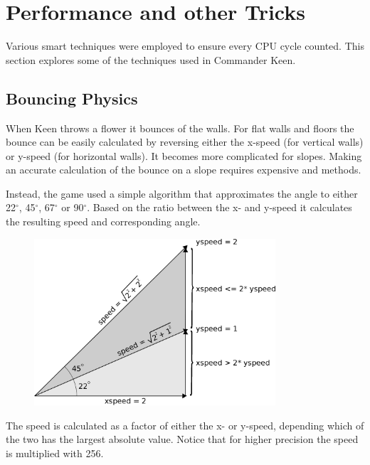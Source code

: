 \documentclass[book.tex]{subfiles}
\begin{document}
\section{Performance and other Tricks}
Various smart techniques were employed to ensure every CPU cycle counted. This section explores some of the techniques used in Commander Keen.


\subsection{Bouncing Physics}
When Keen throws a flower it bounces of the walls. For flat walls and floors the bounce can be easily calculated by reversing either the x-speed (for vertical walls) or y-speed (for horizontal walls). It becomes more complicated for slopes. Making an accurate calculation of the bounce on a slope requires expensive  and  methods. \\
\par
Instead, the game used a simple algorithm that approximates the angle to either 22$^{\circ}$, 45$^{\circ}$, 67$^{\circ}$ or 90$^{\circ}$. Based on the ratio between the x- and y-speed it calculates the resulting speed and corresponding angle. \\
\par
\begin{figure}[H]
\centering
\includegraphics[width=0.8\textwidth]{imgs/drawings/angle_0.eps}
\label{fig:angles}
\end{figure}
\par

The speed is calculated as a factor of either the x- or y-speed, depending which of the two has the largest absolute value. Notice that for higher precision the speed is multiplied with 256.\\
\par
\begin{minipage}{\textwidth}
  
\end{minipage}
\par
\end{document}
